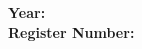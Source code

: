 \begin{latin}
\begin{center}
\vspace{0.3cm}

{\fontsize{12}{16}\selectfont\textbf{Year: \YearEN} \\}
{\fontsize{12}{16}\selectfont\textbf{Register Number: \ThesisNumber} \\}

  \vspace*{3cm}

\end{center}
\end{latin}

\clearpage
